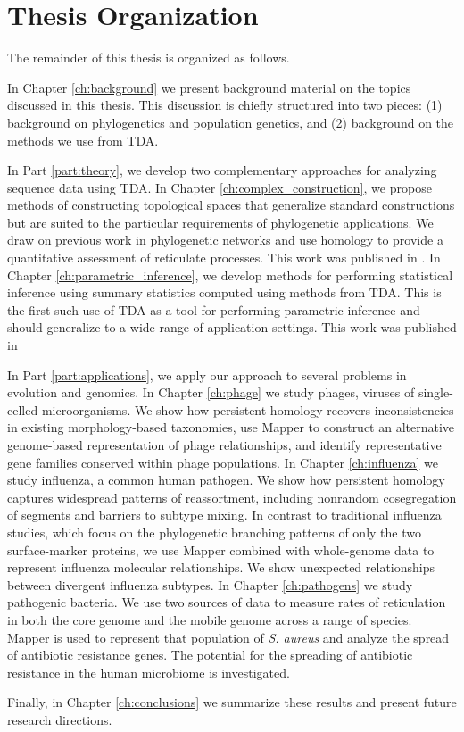 \section{Thesis Organization}

The remainder of this thesis is organized as follows.

In Chapter \ref{ch:background} we present background material on the topics discussed in this thesis.
This discussion is chiefly structured into two pieces: (1) background on phylogenetics and population genetics, and (2) background on the methods we use from TDA.

In Part \ref{part:theory}, we develop two complementary approaches for analyzing sequence data using TDA.
In Chapter \ref{ch:complex_construction}, we propose methods of constructing topological spaces that generalize standard constructions but are suited to the particular requirements of phylogenetic applications.
We draw on previous work in phylogenetic networks and use homology to provide a quantitative assessment of reticulate processes.
This work was published in \cite{Emmett:2015a}.
In Chapter \ref{ch:parametric_inference}, we develop methods for performing statistical inference using summary statistics computed using methods from TDA.
This is the first such use of TDA as a tool for performing parametric inference and should generalize to a wide range of application settings.
This work was published in \cite{Emmett:2014b}

In Part \ref{part:applications}, we apply our approach to several problems in evolution and genomics.
In Chapter \ref{ch:phage} we study phages, viruses of single-celled microorganisms.
We show how persistent homology recovers inconsistencies in existing morphology-based taxonomies, use Mapper to construct an alternative genome-based representation of phage relationships, and identify representative gene families conserved within phage populations.
In Chapter \ref{ch:influenza} we study influenza, a common human pathogen.
We show how persistent homology captures widespread patterns of reassortment, including nonrandom cosegregation of segments and barriers to subtype mixing.
In contrast to traditional influenza studies, which focus on the phylogenetic branching patterns of only the two surface-marker proteins, we use Mapper combined with whole-genome data to represent influenza molecular relationships.
We show unexpected relationships between divergent influenza subtypes.
In Chapter \ref{ch:pathogens} we study pathogenic bacteria.
We use two sources of data to measure rates of reticulation in both the core genome and the mobile genome across a range of species.
Mapper is used to represent that population of \emph{S. aureus} and analyze the spread of antibiotic resistance genes.
The potential for the spreading of antibiotic resistance in the human microbiome is investigated.

Finally, in Chapter \ref{ch:conclusions} we summarize these results and present future research directions.